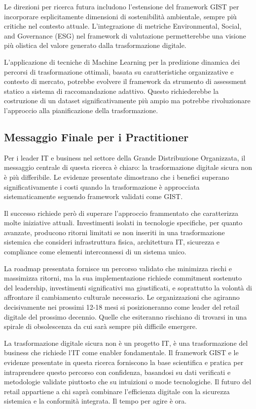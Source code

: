 Le direzioni per ricerca futura includono l'estensione del framework GIST per incorporare esplicitamente dimensioni di sostenibilità ambientale, sempre più critiche nel contesto attuale. L'integrazione di metriche Environmental, Social, and Governance (ESG) nel framework di valutazione permetterebbe una visione più olistica del valore generato dalla trasformazione digitale.

L'applicazione di tecniche di Machine Learning per la predizione dinamica dei percorsi di trasformazione ottimali, basata su caratteristiche organizzative e contesto di mercato, potrebbe evolvere il framework da strumento di assessment statico a sistema di raccomandazione adattivo. Questo richiederebbe la costruzione di un dataset significativamente più ampio ma potrebbe rivoluzionare l'approccio alla pianificazione della trasformazione.

\subsection{Messaggio Finale per i Practitioner}

Per i leader IT e business nel settore della Grande Distribuzione Organizzata, il messaggio centrale di questa ricerca è chiaro: la trasformazione digitale sicura non è più differibile. Le evidenze presentate dimostrano che i benefici superano significativamente i costi quando la trasformazione è approcciata sistematicamente seguendo framework validati come GIST.

Il successo richiede però di superare l'approccio frammentato che caratterizza molte iniziative attuali. Investimenti isolati in tecnologie specifiche, per quanto avanzate, producono ritorni limitati se non inseriti in una trasformazione sistemica che consideri infrastruttura fisica, architettura IT, sicurezza e compliance come elementi interconnessi di un sistema unico.

La roadmap presentata fornisce un percorso validato che minimizza rischi e massimizza ritorni, ma la sua implementazione richiede commitment sostenuto del leadership, investimenti significativi ma giustificati, e soprattutto la volontà di affrontare il cambiamento culturale necessario. Le organizzazioni che agiranno decisivamente nei prossimi 12-18 mesi si posizioneranno come leader del retail digitale del prossimo decennio. Quelle che esiteranno rischiano di trovarsi in una spirale di obsolescenza da cui sarà sempre più difficile emergere.

La trasformazione digitale sicura non è un progetto IT, è una trasformazione del business che richiede l'IT come enabler fondamentale. Il framework GIST e le evidenze presentate in questa ricerca forniscono la base scientifica e pratica per intraprendere questo percorso con confidenza, basandosi su dati verificati e metodologie validate piuttosto che su intuizioni o mode tecnologiche. Il futuro del retail appartiene a chi saprà combinare l'efficienza digitale con la sicurezza sistemica e la conformità integrata. Il tempo per agire è ora.


